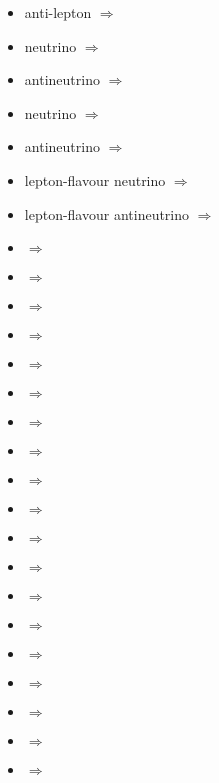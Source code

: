\begin{multicols}{2}
{\begin{itemize}
\item anti-lepton\newline {} $\Rightarrow$ \APlepton
\item neutrino\newline {} $\Rightarrow$ \Pnu
\item antineutrino\newline {} $\Rightarrow$ \APnu
\item neutrino\newline {} $\Rightarrow$ \Pneutrino
\item antineutrino\newline {} $\Rightarrow$ \APneutrino
\item lepton-flavour neutrino\newline {} $\Rightarrow$ \Pnulepton
\item lepton-flavour antineutrino\newline {} $\Rightarrow$ \APnulepton
\item  {} $\Rightarrow$ \Pe
\item  {} $\Rightarrow$ \Pepm
\item  {} $\Rightarrow$ \Pemp
\item  {} $\Rightarrow$ \Pelectron
\item  {} $\Rightarrow$ \APelectron
\item  {} $\Rightarrow$ \Ppositron
\item  {} $\Rightarrow$ \APpositron
\item  {} $\Rightarrow$ \Pmu
\item  {} $\Rightarrow$ \Pmupm
\item  {} $\Rightarrow$ \Pmump
\item  {} $\Rightarrow$ \Pmuon
\item  {} $\Rightarrow$ \APmuon
\item  {} $\Rightarrow$ \Ptau
\item  {} $\Rightarrow$ \Ptaupm
\item  {} $\Rightarrow$ \Ptaump
\item  {} $\Rightarrow$ \Ptauon
\item  {} $\Rightarrow$ \APtauon
\item  {} $\Rightarrow$ \Pnue
\item  {} $\Rightarrow$ \Pnum

\end{itemize}}
\end{multicols}
